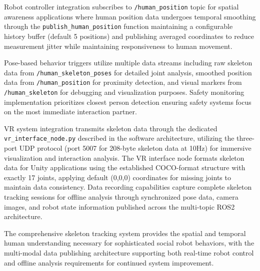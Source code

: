 Robot controller integration subscribes to \texttt{/human\_position} topic for spatial awareness applications where human position data undergoes temporal smoothing through the \texttt{publish\_human\_position} function maintaining a configurable history buffer (default 5 positions) and publishing averaged coordinates to reduce measurement jitter while maintaining responsiveness to human movement.

Pose-based behavior triggers utilize multiple data streams including raw skeleton data from \texttt{/human\_skeleton\_poses} for detailed joint analysis, smoothed position data from \texttt{/human\_position} for proximity detection, and visual markers from \texttt{/human\_skeleton} for debugging and visualization purposes. Safety monitoring implementation prioritizes closest person detection ensuring safety systems focus on the most immediate interaction partner.

VR system integration transmits skeleton data through the dedicated \texttt{vr\_interface\_}\linebreak\texttt{node.py} described in the software architecture, utilizing the three-port UDP protocol (port 5007 for 208-byte skeleton data at 10Hz) for immersive visualization and interaction analysis. The VR interface node formats skeleton data for Unity applications using the established COCO-format structure with exactly 17 joints, applying default (0,0,0) coordinates for missing joints to maintain data consistency. Data recording capabilities capture complete skeleton tracking sessions for offline analysis through synchronized pose data, camera images, and robot state information published across the multi-topic ROS2 architecture.

The comprehensive skeleton tracking system provides the spatial and temporal human understanding necessary for sophisticated social robot behaviors, with the multi-modal data publishing architecture supporting both real-time robot control and offline analysis requirements for continued system improvement.


